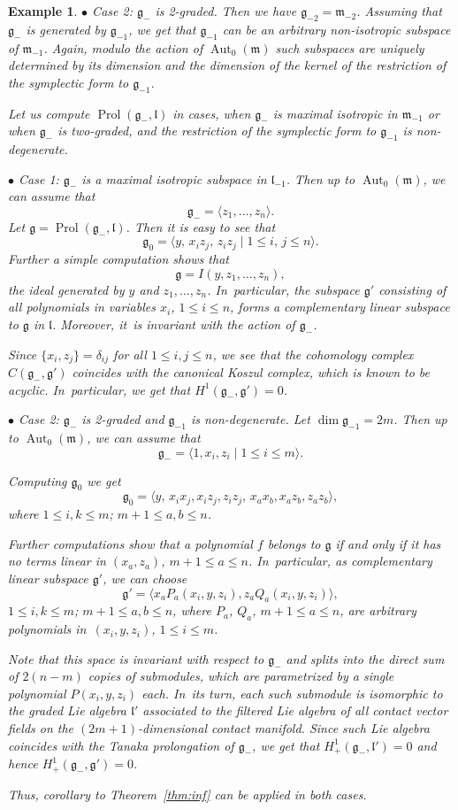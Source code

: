 \documentclass[10pt,a4paper]{amsart}
\newcommand{\g}{\mathfrak g}
\newcommand{\lf}{\mathfrak l}
\newcommand{\m}{\mathfrak m}
\newcommand{\Aut}{\operatorname{Aut}}
\newcommand{\Prol}{\operatorname{Prol}}
\newtheorem{ex}[thm]{Example}
\numberwithin{equation}{section}
\begin{document}
\begin{ex}
$\bullet$ {\it Case} 2: $\g_{-}$ is 2-graded. Then we have $\g_{-2}=\m_{-2}$. Assuming that $\g_-$ is generated by $\g_{-1}$, we get that $\g_{-1}$ can be an arbitrary non-isotropic subspace of $\m_{-1}$. Again, modulo the action of $\Aut_0(\m)$ such subspaces are uniquely determined by its dimension and the dimension of the kernel of the restriction of the symplectic form to $\g_{-1}$.
	
	Let us compute $\Prol(\g_{-}, \lf)$ in cases, when $\g_{-}$ is maximal isotropic in $\m_{-1}$ or when $\g_{-}$ is two-graded, and the restriction of the symplectic form to $\g_{-1}$ is non-degenerate.
	
$\bullet$ {\it Case} 1: $\g_{-}$ is a maximal isotropic subspace in $\lf_{-1}$. Then up to $\Aut_0(\m)$, we can assume that
	\[
	\g_{-} = \langle z_1,\dots, z_n\rangle.
	\]
	Let $\g=\Prol(\g_{-},\lf)$. Then it is easy to see that
	\[
	\g_0 = \langle y,\, x_iz_j,\, z_iz_j \mid 1\le i,\,j\le n\rangle.
	\]
	Further a simple computation shows that
	\[
	\g = I(y,z_1,\dots,z_n),
	\]
	the ideal generated by $y$ and $z_1,\dots,z_n$. In~particular, the subspace $\g'$ consisting of all polynomials in variables $x_i$, $1\le i \le n$, forms a complementary linear subspace to $\g$ in $\lf$. Moreover, it~is invariant with the action of $\g_{-}$.
	
	Since $\{x_i,z_j\} = \delta_{ij}$ for all $1\le i,j\le n$, we see that the cohomology complex $C(\g_{-},\g')$ coincides with the \emph{canonical Koszul complex}, which is known to be acyclic. In~particular, we get that $H^1(\g_{-},\g')=0$.
	
$\bullet$ {\it Case} 2: $\g_{-}$ is 2-graded and $\g_{-1}$ is non-degenerate. Let $\dim \g_{-1} = 2m$. Then up to $\Aut_0(\m)$, we can assume that
	\[
	\g_{-} = \langle 1, x_i,z_i \mid 1\le i \le m \rangle.
	\]
	
	Computing $\g_0$ we get
	\[
	\g_0 = \langle y,\, x_ix_j, x_iz_j, z_iz_j,\, x_ax_b, x_az_b, z_az_b \rangle,
	\]
	where $1\le i,k\le m$; $m+1\le a,b\le n$.
	
	Further computations show that a polynomial $f$ belongs to $\g$ if and only if it has no terms linear in $(x_a,z_a)$, $m+1\le a\le n$. In~particular, as complementary linear subspace $\g'$, we can choose
	\[
	\g'= \big\langle x_a P_a(x_i,y,z_i), z_a Q_a(x_i,y,z_i) \big\rangle,
	\]
	$1\le i,k\le m$; $m+1\le a,b\le n$, where $P_a$, $Q_a$, $m+1\le a\le n$, are arbitrary polynomials in~$(x_i,y,z_i)$, $1\le i\le m$.
	
	Note that this space is invariant with respect to $\g_{-}$ and splits into the direct sum of $2(n-m)$ copies of submodules, which are parametrized by a single polynomial $P(x_i,y,z_i)$ each. In~its turn, each such submodule is isomorphic to the graded Lie algebra $\lf'$ associated to the filtered Lie algebra of all contact vector fields on the $(2m+1)$-dimensional contact manifold. Since such Lie algebra coincides with the Tanaka prolongation of $\g_{-}$, we get that $H^1_{+}(\g_{-},\lf')=0$ and hence $H^1_{+}(\g_{-},\g')=0$.
	
	Thus, corollary to Theorem~\ref{thm:inf} can be applied in both cases.
\end{ex}
\end{document}
